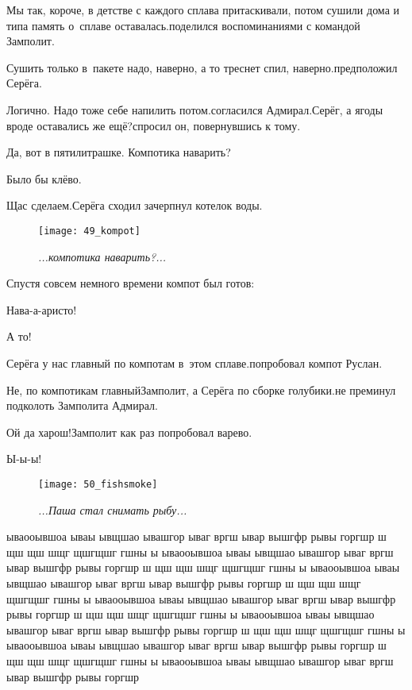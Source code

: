\diagdash Мы так, короче, в детстве с каждого сплава притаскивали, потом сушили дома и типа память о~сплаве оставалась.\mdash поделился воспоминаниями с командой Замполит.

\diagdash Сушить только в~пакете надо, наверно, а то треснет спил, наверно.\mdash предположил Серёга.

\diagdash Логично. Надо тоже себе напилить потом.\mdash согласился Адмирал.\mdash Серёг, а ягоды вроде оставались же ещё?\mdash спросил он, повернувшись к тому.

\diagdash Да, вот в пятилитрашке. Компотика наварить?

\diagdash Было бы клёво.

\diagdash Щас сделаем.\mdash Серёга сходил зачерпнул котелок воды.

\begin{wrapfigure}[10]{r}{0.5\textwidth}
	\centering
	\texttt{[image: 49\_kompot]}
	\caption{\small\textit{...компотика наварить?...}}
\end{wrapfigure}

Спустя совсем немного времени компот был готов:

\diagdash Нава-а-аристо!

\diagdash А то!

\diagdash Серёга у нас главный по компотам в~этом сплаве.\mdash попробовал компот Руслан.

\diagdash Не, по компотикам главный\mdash Замполит, а Серёга по сборке голубики.\mdash не преминул подколоть Замполита Адмирал.

\diagdash Ой да харош!\mdash Замполит как раз попробовал варево.

\diagdash Ы-ы-ы!


\newpage

\begin{wrapfigure}[22]{l}{0.58\textwidth}
	\centering
	\texttt{[image: 50\_fishsmoke]}
	\caption{\small\textit{...Паша стал снимать рыбу...}}
\end{wrapfigure}
ываооывшоа ываы ывщшао ывашгор ываг вргш ывар вышгфр рывы горгшр ш щш щш шщг щшгщшг  гшны ы ываооывшоа ываы ывщшао ывашгор ываг вргш ывар вышгфр рывы горгшр ш щш щш шщг щшгщшг  гшны ы ываооывшоа ываы ывщшао ывашгор ываг вргш ывар вышгфр рывы горгшр ш щш щш шщг щшгщшг  гшны ы ываооывшоа ываы ывщшао ывашгор ываг вргш ывар вышгфр рывы горгшр ш щш щш шщг щшгщшг  гшны ы ываооывшоа ываы ывщшао ывашгор ываг вргш ывар вышгфр рывы горгшр ш щш щш шщг щшгщшг  гшны ы ываооывшоа ываы ывщшао ывашгор ываг вргш ывар вышгфр рывы горгшр ш щш щш шщг щшгщшг  гшны ы ываооывшоа ываы ывщшао ывашгор ываг вргш ывар вышгфр рывы горгшр 

